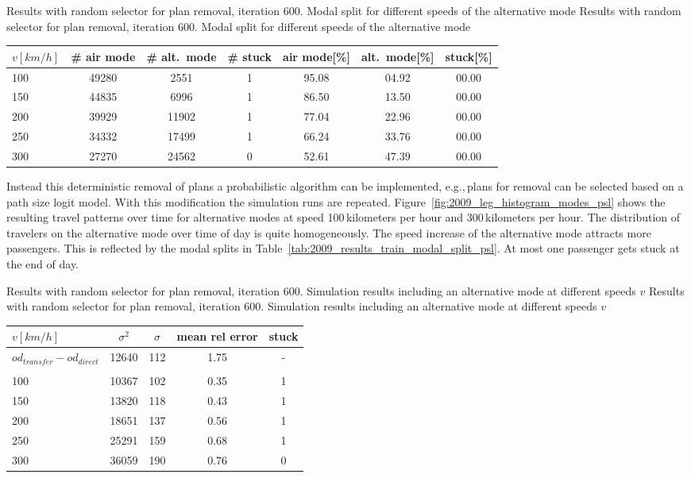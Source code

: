 %
\createtable%
{Results with random selector for plan removal, iteration 600. Modal split for different speeds of the alternative mode}%
{Results with random selector for plan removal, iteration 600. Modal split for different speeds of the alternative mode}%
{\label{tab:2009_results_train_modal_split_psl}}%
{%
  \begin{tabular}{@{}l|ccc|ccc@{}}
		$v [km/h]$	& \# air mode  & \# alt.~mode & \# stuck & air mode[\%]  & alt.~mode[\%] & stuck[\%] \\
		\hline 
		100 & 49280 & 2551 & 1 & 95.08 & 04.92 & 00.00\\	%
		150 & 44835 & 6996 & 1 & 86.50 & 13.50 & 00.00\\	%
		200 & 39929 & 11902 & 1 & 77.04 & 22.96 & 00.00\\	%
		250 & 34332 & 17499 & 1 & 66.24 & 33.76 & 00.00\\	%
		300 & 27270 & 24562 & 0 & 52.61 & 47.39 & 00.00\\	%
	\end{tabular}
}%
{}

Instead this deterministic removal of plans a probabilistic algorithm can be implemented, e.g.,\,plans for removal can be selected based on a path size logit model. 
With this modification the simulation runs are repeated. 
Figure~\ref{fig:2009_leg_histogram_modes_psl} shows the resulting travel patterns over time for alternative modes at speed 100\,kilometers per hour and 300\,kilometers per hour.  
The distribution of travelers on the alternative mode over time of day is quite homogeneously. 
The speed increase of the alternative mode attracts more passengers. 
This is reflected by the modal splits in Table~\ref{tab:2009_results_train_modal_split_psl}. 
At most one passenger gets stuck at the end of day. 

\createtable%
{Results with random selector for plan removal, iteration 600. Simulation results including an alternative mode at different speeds $v$}%
{Results with random selector for plan removal, iteration 600. Simulation results including an alternative mode at different speeds $v$}%
{\label{tab:2009_results_alternative_mode_psl}}%
{%
  \begin{tabular}{@{}l|cccc@{}}
			$v [km/h]$ & $\sigma^2$ & $\sigma$ & mean rel error  & stuck \\
\hline
 $od_{transfer} - od_{direct}$ &  12640 & 112 & 1.75 & - \\
 \\
 100	& 10367 & 102 & 0.35 &  1 \\	%
 150	& 13820 & 118 & 0.43 &  1 \\	%
 200 & 18651 & 137 & 0.56 &  1 \\	%
 250 & 25291 & 159 & 0.68 & 1 \\	%
 300 & 36059 & 190 & 0.76 & 0 \\	%
		\end{tabular}
}%
{}

